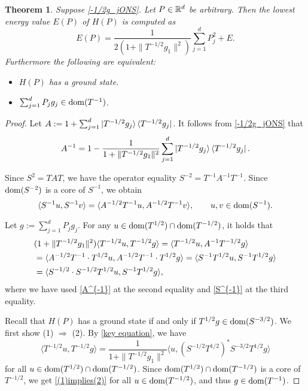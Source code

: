 \documentclass[12pt]{article}
\theoremstyle{plain}
\newtheorem{thm}[theorem]{\bf Theorem}
\numberwithin{equation}{section}
\theoremstyle{remark}
\begin{document}
\begin{thm}
Suppose \eqref{-1/2g_jONS}.
Let $P\in\mathbb{R}^d$ be arbitrary.
Then the lowest energy value $E(P)$ of $H(P)$ is computed as
\[
E(P) = \frac{1}{2(1+\|T^{-1/2}g_1\|^2)}\sum_{j=1}^dP_j^2 + E.
\]
Furthermore the following are equivalent:
\begin{itemize}{}{}
\item[(1)] $H(P)$ has a ground state.
\item[(2)] $\sum_{j=1}^d P_jg_j\in\mathop{\mathrm{dom}}(T^{-1})$.
\end{itemize}
\end{thm}

\begin{proof}
Let $A:=1+\sum_{j=1}^d\ket{T^{-1/2}g_j}\bra{T^{-1/2}g_j}$.
It follows from \eqref{-1/2g_jONS} that
\begin{equation}\label{A^{-1}}
A^{-1} = 1-\frac{1}{1+\|T^{-1/2}g_1\|^2}\sum_{j=1}^d\ket{T^{-1/2}g_j}\bra{T^{-1/2}g_j}.
\end{equation}

Since $S^2 = TAT$, we have the operator equality $S^{-2}=T^{-1}A^{-1}T^{-1}$.
Since $\mathop{\mathrm{dom}}(S^{-2})$ is a core of $S^{-1}$, we obtain
\begin{equation}\label{S^{-1}}
\langle S^{-1}u,S^{-1}v\rangle = \langle A^{-1/2}T^{-1}u,A^{-1/2}T^{-1}v\rangle, \qquad u,v\in \dom(S^{-1}).
\end{equation}

Let $g:=\sum_{j=1}^dP_jg_j$.
For any $u\in\mathop{\mathrm{dom}}(T^{1/2})\cap\mathop{\mathrm{dom}}(T^{-1/2})$, it holds that
\begin{align}\label{key equation}
&(1+\|T^{-1/2}g_1\|^2)\langle T^{-1/2}u,T^{-1/2}g\rangle 
= \langle T^{-1/2}u,A^{-1}T^{-1/2}g\rangle\notag\\
&= \langle A^{-1/2}T^{-1}\cdot T^{1/2}u,A^{-1/2}T^{-1}\cdot T^{1/2}g\rangle
= \langle S^{-1}T^{1/2}u,S^{-1}T^{1/2}g\rangle\notag\\
&= \langle S^{-1/2}\cdot S^{-1/2}T^{1/2}u,S^{-1}T^{1/2}g\rangle,
\end{align}
where we have used \eqref{A^{-1}} at the second equality and \eqref{S^{-1}} at the third equality.

Recall that $H(P)$ has a ground state if and only if $T^{1/2}g\in\mathop{\mathrm{dom}}(S^{-3/2})$.
We first show (1) $\Rightarrow$ (2).
By \eqref{key equation}, we have
\begin{equation}\label{(1)implies(2)}
\langle T^{-1/2}u,T^{-1/2}g\rangle = \frac{1}{1+\|T^{-1/2}g_1\|^2}\langle u,\left(S^{-1/2}T^{1/2}\right)^*S^{-3/2}T^{1/2}g\rangle
\end{equation}
for all $u\in\mathop{\mathrm{dom}}(T^{1/2})\cap\mathop{\mathrm{dom}}(T^{-1/2})$.
Since $\mathop{\mathrm{dom}}(T^{1/2})\cap\mathop{\mathrm{dom}}(T^{-1/2})$ is a core of $T^{-1/2}$, we get \eqref{(1)implies(2)} for all $u\in\mathop{\mathrm{dom}}(T^{-1/2})$, 
and thus $g\in\mathop{\mathrm{dom}}(T^{-1})$.


\end{proof}
\end{document}
